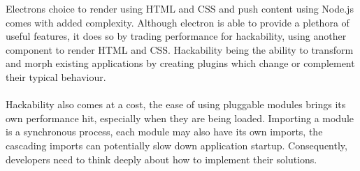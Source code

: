   Electrons choice to render using HTML and CSS and push content using Node.js comes with added complexity. Although electron is able to provide a plethora of useful features, it does so by trading performance for hackability, using another component to render HTML and CSS. Hackability being the ability to transform and morph existing applications by creating plugins which change or complement their typical behaviour.\\\\
  Hackability also comes at a cost, the ease of using pluggable modules brings its own performance hit, especially when they are being loaded. Importing a module is a synchronous process, each module may also have its own imports, the cascading imports can potentially slow down application startup. Consequently, developers need to think deeply about how to implement their solutions.


